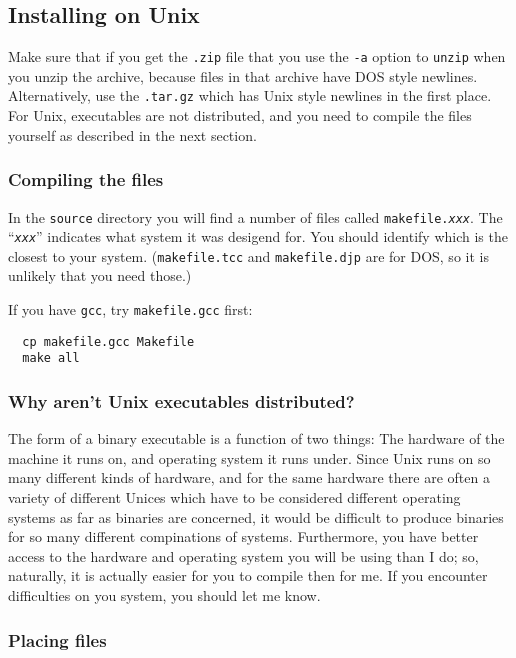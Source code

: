 \documentclass[%
	11pt,
        a4paper,
        twoside]{workrep}
\newcommand*{\cmd}[1]{\texttt{#1}}		%
\newcommand*{\file}[1]{\texttt{#1}}		%
\newcommand*{\opt}[1]{\texttt{#1}}		%
\begin{document}
\subsection{Installing on Unix}

Make sure that if you get the \file{.zip} file that you use the 
\opt{-a} option to \cmd{unzip} when you unzip the archive, because
files in that archive have DOS style newlines.  Alternatively, use
the \file{.tar.gz} which has Unix style newlines in the first place.
For Unix, executables are not distributed, and you need to compile
the files yourself as described in the next section.

\subsubsection{Compiling the files}\label{sec:compile}

In the \file{source} directory you will find a number of files called
\file{makefile.\textit{xxx}}.  The ``\texttt{\itshape xxx}''
indicates what system it was desigend for.  You should identify which
is the closest to your system.  (\file{makefile.tcc} and
\file{makefile.djp} are for DOS, so it is unlikely that you need
those.)

If you have \cmd{gcc}, try \file{makefile.gcc} first:
\begin{verbatim}
  cp makefile.gcc Makefile
  make all
\end{verbatim}

\subsubsection{Why aren't Unix executables distributed?}

The form of a binary executable is a function of two things:  The hardware
of the machine it runs on, and operating system it runs under.  Since
Unix runs on so many different kinds of hardware, and for the same hardware
there are often a variety of different Unices which have to be considered
different operating systems as far as binaries are concerned, it would be
difficult to produce binaries for so many different compinations of systems.
Furthermore, you have better access to the hardware and operating system
you will be using than I do; so, naturally, it is actually easier for
you to compile then for me.  If you encounter difficulties on you system,
you should let me know.

\subsubsection{Placing files}
\end{document}
